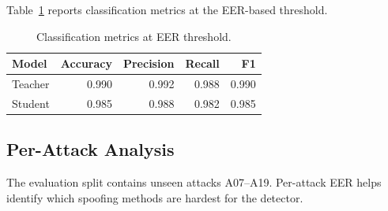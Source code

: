 \documentclass[sigconf]{acmart}
\begin{document}
Table~\ref{tab:metrics} reports classification metrics at the EER-based threshold.

\begin{table}[h]
\centering
\caption{Classification metrics at EER threshold.}
\label{tab:metrics}
\begin{tabular}{lrrrr}
\toprule
Model & Accuracy & Precision & Recall & F1 \\
\midrule
Teacher & 0.990 & 0.992 & 0.988 & 0.990 \\
Student & 0.985 & 0.988 & 0.982 & 0.985 \\
\bottomrule
\end{tabular}
\end{table}

\subsection{Per-Attack Analysis}

The evaluation split contains unseen attacks A07--A19. Per-attack EER helps identify which spoofing methods are hardest for the detector.

\begin{table}[h]
\centering
\caption{Per-attack EER on ASVspoof 2019 LA evaluation attacks.}
\label{tab:perattack}
\end{table}
\end{document}
